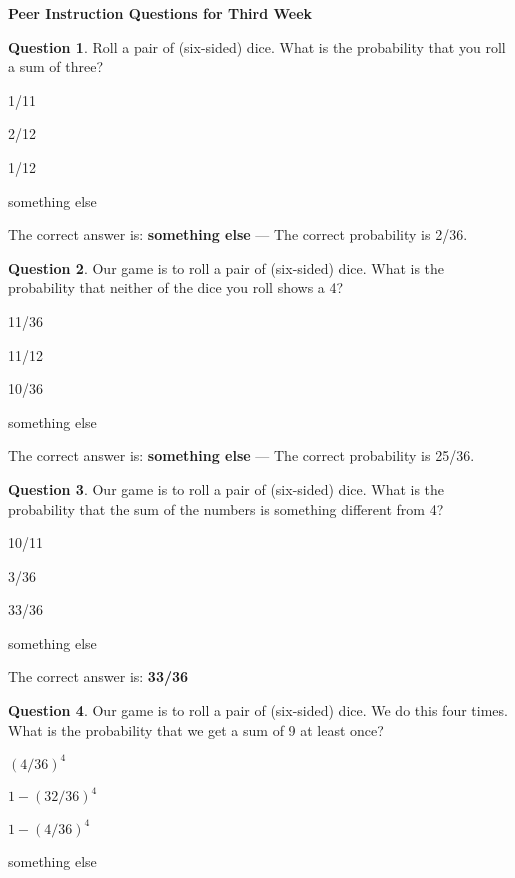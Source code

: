 \documentclass[12pt]{amsart}
\theoremstyle{definition}
\newtheorem{question}{Question}
\begin{document}
\begin{center}
\textbf{\Huge
Peer Instruction Questions for Third Week
}
\end{center}
\vspace{.5in}


\begin{question}
Roll a pair of (six-sided) dice. What is the probability that you roll a sum of three?
\begin{compactitem}
\item 1/11
\item 2/12
\item 1/12
\item something else
\end{compactitem}
\end{question}

The correct answer is: \textbf{something else} --- The correct probability is 2/36.


\begin{question}
Our game is to roll a pair of (six-sided) dice. What is the probability that neither of the dice you roll shows a 4?
\begin{compactitem}
\item 11/36
\item 11/12
\item 10/36
\item something else
\end{compactitem}
\end{question}

The correct answer is: \textbf{something else} --- The correct probability is 25/36.


\begin{question}
Our game is to roll a pair of (six-sided) dice. What is the probability that the sum of the numbers is something different from 4?
\begin{compactitem}
\item 10/11
\item 3/36
\item 33/36
\item something else
\end{compactitem}
\end{question}

The correct answer is:  \textbf{33/36}


\begin{question}
Our game is to roll a pair of (six-sided) dice. We do this four times. What is the probability that we get a sum of 9 at least once?
\begin{compactitem}
\item $(4/36)^4$
\item $1 - (32/36)^4$
\item $1 - (4/36)^4$
\item something else
\end{compactitem}
\end{question}
\end{document}
